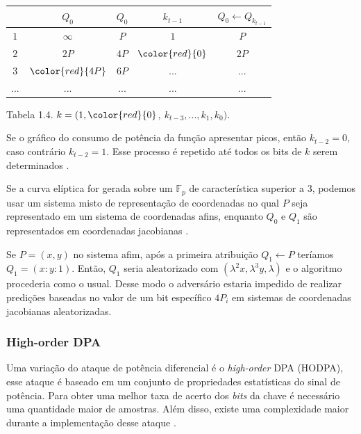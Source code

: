 \begin{center}
    \begin{tabular}{|c|c|c|c|c|}
	    \hline
		    \   & $Q_{0}$  & $Q_{0}$ & $k_{t-1}$ & $Q_{0} \leftarrow Q_{k_{t-1}}$\\
	    \hline
	        $1$ & $\infty$ &     $P$ &       $1$ & $P$\\
	    \hline
		    $2$ & $2P$ & $4P$ & $\color{red}{0}$ & $2P$ \\
	    \hline
		    $3$ & $\color{red}{4P}$ & $6P$ & ...& ... \\
	    \hline
		    ... & ... & ... & ...& ... \\
	    \hline
    \end{tabular}

    Tabela 1.4. $k = (1, \color{red}{0}$$,\ $$k_{t-3}, ..., k_{1}, k_{0})$.
\end{center}

Se o gr\'{a}fico do consumo de pot\^{e}ncia da fun\c{c}\~{a}o apresentar picos, ent\~{a}o $k_{t-2} = 0$, caso contr\'{a}rio $k_{t-2} = 1$.
Esse processo \'{e} repetido at\'{e} todos os bits de $k$ serem determinados \cite{ECCBook_HankersonVanstone2004}.

Se a curva el\'{i}ptica for gerada sobre um $\mathbb{F}_{p}$ de caracter\'{i}stica superior a 3, podemos usar um sistema misto de representa\c{c}\~{a}o de coordenadas no qual $P$ seja representado em um sistema de coordenadas afins, enquanto $Q_{0}$ e $Q_{1}$ s\~{a}o representados em coordenadas jacobianas \cite{ECCBook_HankersonVanstone2004}.

Se $P = (x,y)$ no sistema afim, ap\'{o}s a primeira atribui\c{c}\~{a}o $Q_{1} \leftarrow P$ ter\'{i}amos $ Q_{1} = (x : y : 1)$. Ent\~{a}o, $Q_{1}$ seria aleatorizado com $(\lambda^{2}x, \lambda^{3}y, \lambda)$ e o algoritmo procederia como o usual. Desse modo o advers\'{a}rio estaria impedido de realizar predi\c{c}\~{o}es baseadas no valor de um bit espec\'{i}fico $4P_{i}$ em sistemas de coordenadas jacobianas aleatorizadas.

\subsubsection{High-order DPA}
Uma variação do ataque de potência diferencial é o \textit{high-order} DPA (HODPA), esse ataque é baseado em um conjunto de propriedades estatísticas do sinal de potência. Para obter uma melhor taxa de acerto dos \textit{bits} da chave é necessário uma quantidade maior de amostras. Além disso, existe uma complexidade maior durante a implementação desse ataque \cite{benedikt:2009:228}.

